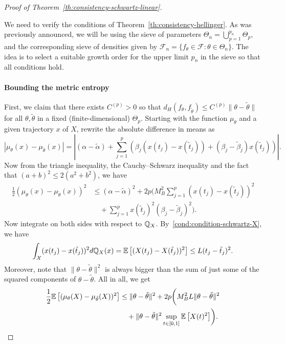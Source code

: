 \begin{proof}[Proof of Theorem~\ref{th:consistency-schwartz-linear}]\label{proof:consistency-schwartz-linear}

We need to verify the conditions of Theorem~\ref{th:consistency-hellinger}. As was previously announced, we will be using the sieve of parameters \(\Theta_n = \bigcup_{p=1}^{p_n} \Theta_p\), and the corresponding sieve of densities given by \(\mathcal F_n=\{f_\theta\in \mathcal F: \theta \in \Theta_n\}\). The idea is to select a suitable growth order for the upper limit \(p_n\) in the sieve so that all conditions hold.

\paragraph{Bounding the metric entropy} First, we claim that there exists \(C^{(p)}>0\) so that \(d_H(f_\theta, f_{\tilde\theta})\leq C^{(p)}\|\theta - \tilde\theta\|\) for all \(\theta, \tilde\theta\) in a fixed (finite-dimensional) \(\Theta_p\). Starting with the function \(\mu_\theta\) and a given trajectory \(x\) of \(X\), rewrite the absolute difference in means as
\[
  |\mu_\theta(x) - \mu_{\tilde\theta}(x)| = \left| (\alpha - \tilde\alpha) + \sum_{j=1}^p \left(\beta_j (x(t_j) - x(\tilde t_{j}))+ (\beta_j - \tilde\beta_{j})x(\tilde t_{j})\right) \right|.
\]
Now from the triangle inequality, the Cauchy--Schwarz inequality and the fact that \((a+b)^2 \leq 2(a^2 + b^2)\), we have
\begin{align*}
  \frac{1}{2}(\mu_\theta(x) - \mu_{\tilde\theta}(x))^2 &\leq (\alpha - \tilde\alpha)^2 + 2p\biggl(M_B^2\sum_{j=1}^p (x(t_j) - x(\tilde t_j))^2\\
  &\quad + \sum_{j=1}^p x(\tilde t_j)^2(\beta_j - \tilde\beta_j)^2\biggr).
\end{align*}
Now integrate on both sides with respect to \(\mathbb{Q}_X\). By~\ref{cond:condition-schwartz-X}, we have
\[
\int_{\mathcal X} (x(t_j) - x(\tilde t_j))^2 d\mathbb{Q}_X(x) = \mathbb{E}\left[(X(t_j) - X(\tilde t_j))^2\right] \leq L(t_j - \tilde t_j)^2.
\]
Moreover, note that \(\|\theta-\tilde\theta\|^2\) is always bigger than the sum of just some of the squared components of \(\theta - \tilde\theta\). All in all, we get
\begin{align*}
  \frac{1}{2}\E\left[(\mu_\theta(X) - \mu_{\tilde\theta}(X))^2\right] &\leq \|\theta - \tilde\theta\|^2 + 2p\biggl(M_B^2 L \|\theta - \tilde\theta\|^2\\ 
  &\quad + \|\theta - \tilde\theta\|^2 \sup_{t\in[0,1]} \E\left[X(t)^2\right] \biggr).

\end{align*}
\end{proof}
